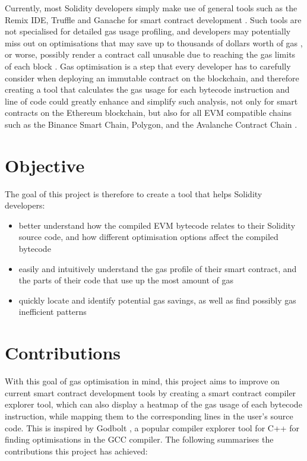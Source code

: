 Currently, most Solidity developers simply make use of general tools such as the Remix IDE, Truffle and Ganache for
smart contract development \cite{consensystools}. Such tools are not specialised for detailed gas usage profiling, and developers
may potentially miss out on optimisations that may save up to thousands of dollars worth of gas \cite{gaschecker},
or worse, possibly render a contract call unusable due to reaching the gas limits of each block \cite{governmentalstuck}.
Gas optimisation is a step that every developer has to carefully consider when deploying an immutable contract on the blockchain,
and therefore creating a tool that calculates the gas usage for each bytecode instruction 
and line of code could greatly enhance and simplify such analysis, not only for 
smart contracts on the Ethereum blockchain, but also for all EVM compatible chains such as
the Binance Smart Chain, Polygon, and the Avalanche Contract Chain \cite{evmcompatiblechains}.

\section{Objective}

The goal of this project is therefore to create a tool that helps Solidity developers:

\begin{itemize}
  \item better understand how the compiled EVM bytecode relates to their Solidity source code,
  and how different optimisation options affect the compiled bytecode
  \item easily and intuitively understand the gas profile of their smart contract, and
  the parts of their code that use up the most amount of gas
  \item quickly locate and identify potential gas savings, as well as find possibly gas
  inefficient patterns
\end{itemize}

\section{Contributions}

With this goal of gas optimisation in mind, this project aims to improve on current 
smart contract development tools by creating a smart contract compiler explorer tool,
which can also display a heatmap of the gas usage of each bytecode instruction, while mapping
them to the corresponding lines in the user's source code. This is inspired by Godbolt \cite{godbolt},
a popular compiler explorer tool for C++ for finding optimisations in the GCC compiler.
The following summarises the contributions this project has achieved:

